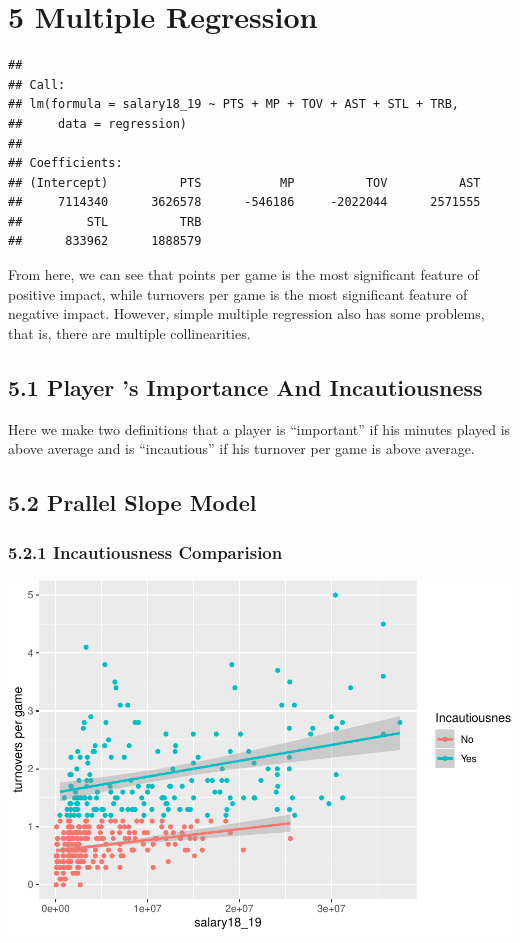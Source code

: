 \documentclass[]{article}
\begin{document}
\section{5 Multiple Regression}\label{multiple-regression}

\begin{verbatim}
## 
## Call:
## lm(formula = salary18_19 ~ PTS + MP + TOV + AST + STL + TRB, 
##     data = regression)
## 
## Coefficients:
## (Intercept)          PTS           MP          TOV          AST  
##     7114340      3626578      -546186     -2022044      2571555  
##         STL          TRB  
##      833962      1888579
\end{verbatim}

From here, we can see that points per game is the most significant
feature of positive impact, while turnovers per game is the most
significant feature of negative impact. However, simple multiple
regression also has some problems, that is, there are multiple
collinearities.

\subsection{5.1 Player 's Importance And
Incautiousness}\label{player-s-importance-and-incautiousness}

Here we make two definitions that a player is ``important'' if his
minutes played is above average and is ``incautious'' if his turnover
per game is above average.

\subsection{5.2 Prallel Slope Model}\label{prallel-slope-model}

\subsubsection{5.2.1 Incautiousness
Comparision}\label{incautiousness-comparision}

\includegraphics{Final_Report_files/figure-latex/unnamed-chunk-19-1.pdf}
\end{document}
